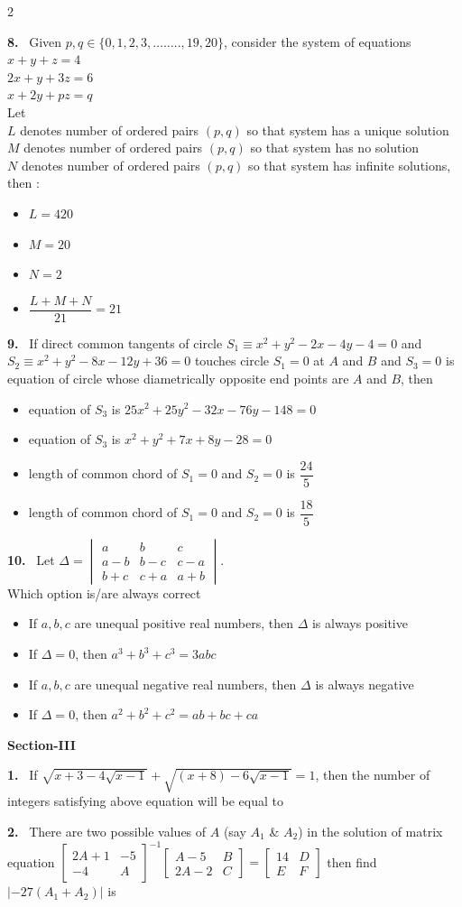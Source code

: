 \documentclass[10pt]{extarticle}
\newcommand{\sect}[1]{\par\smallskip\noindent\textbf{#1}\par}
\newcommand{\qn}[1]{\par\smallskip\noindent\textbf{#1.}~}
\newenvironment{qoptions}{\begin{itemize}[leftmargin=1.8em,itemsep=1pt,topsep=2pt,label={}]}{\end{itemize}}
\newcommand{\opt}[2]{\item[(#1)] #2}
\begin{document}
\begin{multicols}{2}
\qn{8} Given $p,q\in\{0,1,2,3,\ldots\ldots..,19,20\}$, consider the system of equations\\
$x+y+z=4$\\
$2x+y+3z=6$\\
$x+2y+pz=q$\\
Let\\
$L$ denotes number of ordered pairs $(p,q)$ so that system has a unique solution\\
$M$ denotes number of ordered pairs $(p,q)$ so that system has no solution\\
$N$ denotes number of ordered pairs $(p,q)$ so that system has infinite solutions,\\
then :
\begin{qoptions}
\opt{A}{$L=420$}
\opt{B}{$M=20$}
\opt{C}{$N=2$}
\opt{D}{$\dfrac{L+M+N}{21}=21$}
\end{qoptions}

\qn{9} If direct common tangents of circle $S_1\equiv x^2+y^2-2x-4y-4=0$ and $S_2\equiv x^2+y^2-8x-12y+36=0$ touches circle $S_1=0$ at $A$ and $B$ and $S_3=0$ is equation of circle whose diametrically opposite end points are $A$ and $B$, then
\begin{qoptions}
\opt{A}{equation of $S_3$ is $25x^2+25y^2-32x-76y-148=0$}
\opt{B}{equation of $S_3$ is $x^2+y^2+7x+8y-28=0$}
\opt{C}{length of common chord of $S_1=0$ and $S_2=0$ is $\dfrac{24}{5}$}
\opt{D}{length of common chord of $S_1=0$ and $S_2=0$ is $\dfrac{18}{5}$}
\end{qoptions}

\qn{10} Let $\Delta=\begin{vmatrix}a&b&c\\a-b&b-c&c-a\\b+c&c+a&a+b\end{vmatrix}$.\\
Which option is/are always correct
\begin{qoptions}
\opt{A}{If $a,b,c$ are unequal positive real numbers, then $\Delta$ is always positive}
\opt{B}{If $\Delta=0$, then $a^3+b^3+c^3=3abc$}
\opt{C}{If $a,b,c$ are unequal negative real numbers, then $\Delta$ is always negative}
\opt{D}{If $\Delta=0$, then $a^2+b^2+c^2=ab+bc+ca$}
\end{qoptions}

\sect{Section-III}

\qn{1} If $\sqrt{x+3-4\sqrt{x-1}}+\sqrt{(x+8)-6\sqrt{x-1}}=1$, then the number of integers satisfying above equation will be equal to

\qn{2} There are two possible values of $A$ (say $A_1$ \& $A_2$) in the solution of matrix equation $\begin{bmatrix}2A+1&-5\\-4&A\end{bmatrix}^{-1}\begin{bmatrix}A-5&B\\2A-2&C\end{bmatrix}=\begin{bmatrix}14&D\\E&F\end{bmatrix}$ then find $|-27(A_1+A_2)|$ is


\end{multicols}
\end{document}
